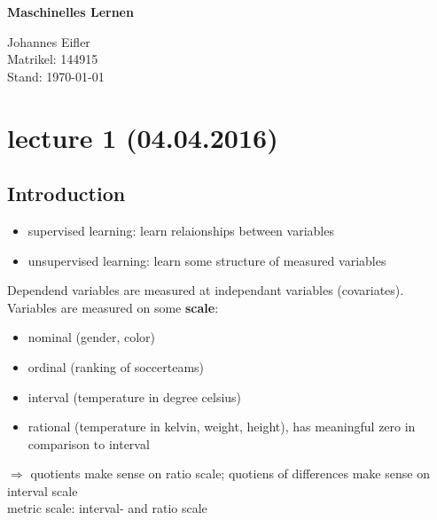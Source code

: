 \documentclass[a4paper, 12pt]{scrartcl}
\begin{document}
\begin{normalsize}

\raggedright\textbf{\Huge Maschinelles Lernen}\\	
		\begin{flushright}
		Johannes Eifler\\
		Matrikel: 144915\\
		Stand: \space \today \space \thistime
		\end{flushright}

\end{normalsize}
\section*{lecture 1 (04.04.2016)}
\subsection*{Introduction}

\begin{itemize}
 \item supervised learning: learn relaionships between variables
 \item unsupervised learning: learn some structure of measured variables
\end{itemize}

Dependend variables are measured at independant variables (covariates). Variables are measured on some \textbf{scale}:

\begin{itemize}
 \item nominal (gender, color)
 \item ordinal (ranking of soccerteams)
 \item interval (temperature in degree celsius)
 \item rational (temperature in kelvin, weight, height), has meaningful zero in comparison to interval
\end{itemize}

$\Rightarrow$ quotients make sense on ratio scale; quotiens of differences make sense on interval scale\\
metric scale: interval- and ratio scale  \\
\end{document}
